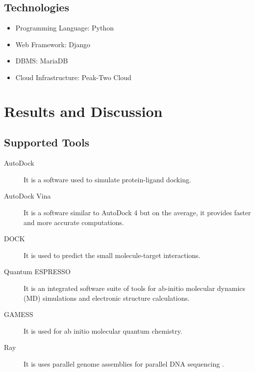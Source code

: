 	
\subsection{Technologies}
	\begin{itemize}
   		\item Programming Language: Python 
   		\item Web Framework: Django  
   		\item DBMS: MariaDB  
   		\item Cloud Infrastructure: Peak-Two Cloud 
	\end{itemize}	
	
\section{Results and Discussion}

\subsection{Supported Tools}
		
	\begin{description}
    	\item[AutoDock] \hfill \break 
        	It is a software used to simulate protein-ligand docking\cite{morris2009autodock4}.
        \item[AutoDock Vina] \hfill \break
            It is a software similar to AutoDock 4 but on the average, it provides faster and more accurate computations\cite{JCC:JCC21334}. 
            
            
            
		\item[DOCK] \hfill \break
            It is used to predict the small molecule-target interactions\cite{lang2009dock}.
            
      	\item[Quantum ESPRESSO] \hfill \break
            It is an integrated software suite of tools for ab-initio molecular dynamics (MD) simulations and electronic structure calculations\cite{QE-2009}.

  		\item[GAMESS] \hfill \break
            It is used for ab initio molecular quantum chemistry. \cite{1993gamess}
            
 	    \item[Ray] \hfill \break
            It is uses parallel genome assemblies for parallel DNA sequencing \cite{boisvert_ray_2012}.
          \end{description}
          
